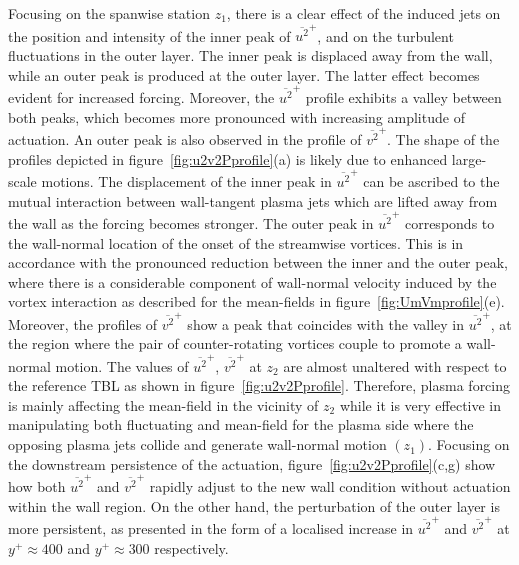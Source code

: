 Focusing on the spanwise station $z_1$, there is a clear effect of the induced jets on the position and intensity of the inner peak of $\overline{u^2}^+$, and on the turbulent fluctuations in the outer layer. The inner peak is displaced away from the wall, while an outer peak is produced at the outer layer. The latter effect becomes evident for increased forcing. Moreover, the $\overline{u^2}^+$ profile exhibits a valley between both peaks, which becomes more pronounced with increasing amplitude of actuation. An outer peak is also observed in the profile of $\overline{v^2}^+$. The shape of the profiles depicted in figure~\ref{fig:u2v2Pprofile}(a) is likely due to enhanced large-scale motions.
The displacement of the inner peak in $\overline{u^2}^+$ can be ascribed to the mutual interaction between wall-tangent plasma jets which are lifted away from the wall as the forcing becomes stronger. The outer peak in $\overline{u^2}^+$ corresponds to the wall-normal location of the onset of the streamwise vortices. This is in accordance with the pronounced reduction between the inner and the outer peak, where there is a considerable component of wall-normal velocity induced by the vortex interaction as described for the mean-fields in figure~\ref{fig:UmVmprofile}(e). Moreover, the profiles of $\overline{v^2}^+$ show a peak that coincides with the valley in $\overline{u^2}^+$, at the region where the pair of counter-rotating vortices couple to promote a wall-normal motion. The values of $\overline{u^2}^+$, $\overline{v^2}^+$ at $z_2$ are almost unaltered with respect to the reference TBL as shown in figure~\ref{fig:u2v2Pprofile}. Therefore, plasma forcing is mainly affecting the mean-field in the vicinity of $z_2$ while it is very effective in manipulating both fluctuating and mean-field for the plasma side where the opposing plasma jets collide and generate wall-normal motion $(z_1)$. Focusing on the downstream persistence of the actuation, figure~\ref{fig:u2v2Pprofile}(c,g) show how both $\overline{u^2}^+$ and $\overline{v^2}^+$ rapidly adjust to the new wall condition without actuation within the wall region. On the other hand, the perturbation of the outer layer is more persistent, as presented in the form of a localised increase in $\overline{u^2}^+$ and $\overline{v^2}^+$ at $y^+\approx 400$ and $y^+\approx 300$ respectively.

